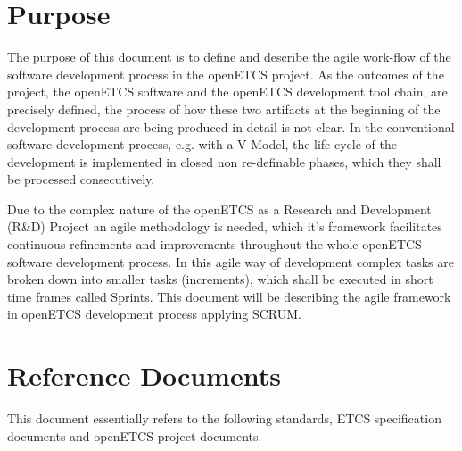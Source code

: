 \section{Purpose}
\label{sec:purpose}

The purpose of this document is to define and describe the agile work-flow of the software development process in the openETCS project. As the outcomes of the project, the openETCS software and the openETCS development tool chain, are precisely defined, the process of how these two artifacts at the beginning of the development process are being produced in detail is not clear. In the conventional software development  process, e.g. with a V-Model, the life cycle of the development is implemented in closed non re-definable phases, which they shall be processed consecutively. 

Due to the complex nature of the openETCS as a  Research and Development (R\&D) Project an agile methodology is needed, which it's framework facilitates continuous refinements and improvements throughout the whole openETCS software development process. In this agile way of development complex tasks are broken down into smaller tasks (increments), which shall be executed in short time frames called Sprints. This document will be describing the agile framework in openETCS development process applying SCRUM.








\section{Reference Documents}
\label{sec:refdoc}

This document essentially refers to the following standards, ETCS specification documents and openETCS project documents.

